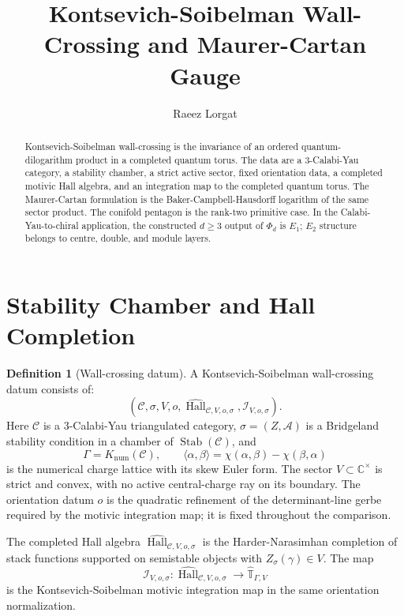 \documentclass[11pt]{article}
\title{Kontsevich-Soibelman Wall-Crossing and Maurer-Cartan Gauge}
\author{Raeez Lorgat}
\date{}
\theoremstyle{definition}
\newtheorem{definition}[theorem]{Definition}
\providecommand{\C}{\mathbb{C}}
\providecommand{\cA}{\mathcal{A}}
\providecommand{\cC}{\mathcal{C}}
\providecommand{\Hall}{\operatorname{Hall}}
\providecommand{\Stab}{\operatorname{Stab}}
\providecommand{\Eone}{E_1}
\providecommand{\Etwo}{E_2}
\begin{document}
\maketitle

\begin{abstract}
Kontsevich-Soibelman wall-crossing is the invariance of an ordered
quantum-dilogarithm product in a completed quantum torus.  The data are a
3-Calabi-Yau category, a stability chamber, a strict active sector, fixed
orientation data, a completed motivic Hall algebra, and an integration map
to the completed quantum torus.  The Maurer-Cartan formulation is the
Baker-Campbell-Hausdorff logarithm of the same sector product.  The
conifold pentagon is the rank-two primitive case.  In the
Calabi-Yau-to-chiral application, the constructed $d\geq 3$ output of
$\Phi_d$ is $\Eone$; $\Etwo$ structure belongs to centre, double, and
module layers.
\end{abstract}

\section{Stability Chamber and Hall Completion}

\begin{definition}[Wall-crossing datum]
\label{def:wc-datum}
A Kontsevich-Soibelman wall-crossing datum consists of:
\[
(\cC,\sigma,V,o,\widehat{\Hall}_{\cC,V,o,\sigma},\mathcal I_{V,o,\sigma}).
\]
Here $\cC$ is a 3-Calabi-Yau triangulated category, $\sigma=(Z,\cA)$ is a
Bridgeland stability condition in a chamber of $\Stab(\cC)$, and
\[
 \Gamma=K_{\mathrm{num}}(\cC),\qquad
 \langle\alpha,\beta\rangle
 =
 \chi(\alpha,\beta)-\chi(\beta,\alpha)
\]
is the numerical charge lattice with its skew Euler form.  The sector
$V\subset\C^\times$ is strict and convex, with no active central-charge
ray on its boundary.  The orientation datum $o$ is the quadratic
refinement of the determinant-line gerbe required by the motivic
integration map; it is fixed throughout the comparison.

The completed Hall algebra
$\widehat{\Hall}_{\cC,V,o,\sigma}$ is the Harder-Narasimhan completion
of stack functions supported on semistable objects with
$Z_\sigma(\gamma)\in V$.  The map
\[
 \mathcal I_{V,o,\sigma}\colon
 \widehat{\Hall}_{\cC,V,o,\sigma}
 \longrightarrow
 \widehat{\mathbb T}_{\Gamma,V}
\]
is the Kontsevich-Soibelman motivic integration map in the same
orientation normalization.
\end{definition}
\end{document}
